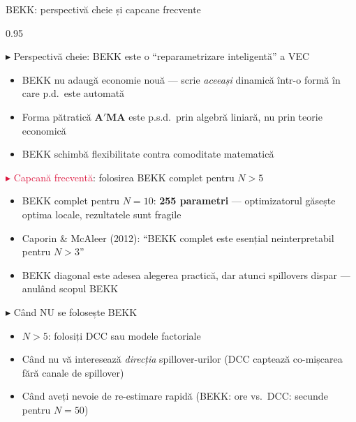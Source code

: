 \documentclass[9pt, aspectratio=169, t]{beamer}
\begin{document}
\begin{frame}{BEKK: perspectivă cheie și capcane frecvente}
    \begin{cminipage}{0.95\textwidth}
    \vspace{-2mm}
    {\scriptsize
    \begin{block}{\textcolor{MainBlue}{$\blacktriangleright$ Perspectivă cheie}: BEKK este o ``reparametrizare inteligentă'' a VEC}
        \begin{itemize}\setlength{\itemsep}{0pt}
            \item BEKK nu adaugă economie nouă --- scrie \textit{aceeași} dinamică într-o formă în care p.d.\ este automată
            \item Forma pătratică $\mathbf{A}'\mathbf{M}\mathbf{A}$ este p.s.d.\ prin algebră liniară, nu prin teorie economică
            \item BEKK schimbă flexibilitate contra comoditate matematică
        \end{itemize}
    \end{block}
    \vspace{-2mm}
    \begin{alertblock}{\textcolor{Crimson}{$\blacktriangleright$ Capcană frecventă}: folosirea BEKK complet pentru $N > 5$}
        \begin{itemize}\setlength{\itemsep}{0pt}
            \item BEKK complet pentru $N = 10$: \textbf{255 parametri} --- optimizatorul găsește optima locale, rezultatele sunt fragile
            \item Caporin \& McAleer (2012): ``BEKK complet este esențial neinterpretabil pentru $N > 3$''
            \item BEKK diagonal este adesea alegerea practică, dar atunci spillovers dispar --- anulând scopul BEKK
        \end{itemize}
    \end{alertblock}
    \vspace{-2mm}
    \begin{exampleblock}{\textcolor{Forest}{$\blacktriangleright$ Când NU se folosește BEKK}}
        \begin{itemize}\setlength{\itemsep}{0pt}
            \item $N > 5$: folosiți DCC sau modele factoriale
            \item Când nu vă interesează \textit{direcția} spillover-urilor (DCC captează co-mișcarea fără canale de spillover)
            \item Când aveți nevoie de re-estimare rapidă (BEKK: ore vs.\ DCC: secunde pentru $N = 50$)
        \end{itemize}
    \end{exampleblock}
    }
    \end{cminipage}
\end{frame}
\end{document}
